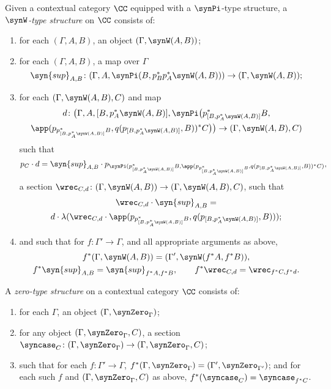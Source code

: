 \begin{definition}
Given a contextual category $\CC$ equipped with a $\synPi$-type structure, a \emph{$\synW$-type structure} on $\CC$ consists of:
\begin{enumerate}
   \item for each $(\Gamma, A, B)$, an object $(\Gamma, \synW(A,B))$;
  \item for each $(\Gamma,A,B)$, a map over $\Gamma$
\[ \syn{sup}_{A,B} \colon (\Gamma, A, \synPi(B,p_B^*p_A^*\synW(A,B))) \to (\Gamma, \synW(A,B)); \]
  \item for each $(\Gamma,\synW(A,B),C)$ and map 
\begin{multline*}
  d \colon \big( \Gamma, A, [B,p_A^*\synW(A,B)], \synPi \big( p_{[B,p_A^*\synW(A,B)]}^*B, \\
  \app(p_{p_{[B,p_A^*\synW(A,B)]}^*B},q(p_{[B,p_A^*\synW(A,B)]},B))^*C\big)\big) \to (\Gamma,\synW(A,B),C)
\end{multline*}
such that 
\[ p_C \cdot d = \syn{sup}_{A,B} \cdot p_{\synPi(p_{[B,p_A^*\synW(A,B)]}^*B,\app(p_{p_{[B,p_A^*\synW(A,B)]}^*B},q(p_{[B,p_A^*\synW(A,B)]},B))^*C)}, \]
a section $\wrec_{C,d} \colon (\Gamma,\synW(A,B)) \to (\Gamma,\synW(A,B),C)$, such that 
\begin{multline*}
  \wrec_{C,d} \cdot \syn{sup}_{A,B} = \\
  d \cdot \lambda(\wrec_{C,d} \cdot \app(p_{p_{[B,p_A^*\synW(A,B)]}^*B},q(p_{[B,p_A^*\synW(A,B)]},B)));
\end{multline*}
  \item and such that for $f \colon \Gamma' \to \Gamma$, and all appropriate arguments as above,
    \begin{gather*}
     f^*(\Gamma, \synW(A,B)) = (\Gamma', \synW(f^*A,f^*B)), \\
     f^*\syn{sup}_{A,B} = \syn{sup}_{f^*A,f^*B}, \qquad f^*\wrec_{C,d} = \wrec_{f^*C,f^*d}.
    \end{gather*}
 \end{enumerate}
\end{definition}

\begin{definition}
A \emph{zero-type structure} on a contextual category $\CC$ consists of:
\begin{enumerate}
  \item for each $\Gamma$, an object $(\Gamma,\synZero_\Gamma)$;
  \item for any object $(\Gamma,\synZero_\Gamma, C)$, a section $\syncase_C \colon (\Gamma,\synZero_\Gamma) \to (\Gamma,\synZero_\Gamma, C)$;
  \item such that for each $f \colon \Gamma' \to \Gamma$, $f^*(\Gamma, \synZero_\Gamma) = (\Gamma', \synZero_{\Gamma'})$; and for each such $f$ and $(\Gamma,\synZero_\Gamma, C)$ as above, $f^*(\syncase_C) = \syncase_{f^*C}$.
  \end{enumerate}
\end{definition}

